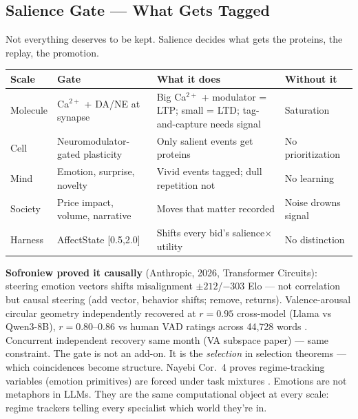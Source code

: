 \documentclass[11pt]{article}
\begin{document}
\subsection{Salience Gate --- What Gets Tagged}

Not everything deserves to be kept. Salience decides what gets the proteins, the replay, the promotion.

\begin{center}
\small
\begin{tabular}{p{2.2cm}p{3.3cm}p{4.6cm}p{2.2cm}}
\toprule
Scale & Gate & What it does & Without it \\
\midrule
Molecule & Ca$^{2+}$ + DA/NE at synapse & Big Ca$^{2+}$ + modulator = LTP; small = LTD; tag-and-capture needs signal & Saturation \\
Cell & Neuromodulator-gated plasticity & Only salient events get proteins & No prioritization \\
Mind & Emotion, surprise, novelty & Vivid events tagged; dull repetition not & No learning \\
Society & Price impact, volume, narrative & Moves that matter recorded & Noise drowns signal \\
Harness & AffectState [0.5,2.0] & Shifts every bid's salience$\times$utility & No distinction \\
\bottomrule
\end{tabular}
\end{center}

\textbf{Sofroniew proved it causally} \citep{sofroniew2026} (Anthropic, 2026, Transformer Circuits): steering emotion vectors shifts misalignment $\pm212$/$-303$ Elo --- not correlation but causal steering (add vector, behavior shifts; remove, returns). Valence-arousal circular geometry independently recovered at $r=0.95$ cross-model (Llama vs Qwen3-8B), $r=0.80$--0.86 vs human VAD ratings across 44,728 words \citep{sofroniew2026}. Concurrent independent recovery same month (VA subspace paper) --- same constraint. The gate is not an add-on. It is the \emph{selection} in selection theorems --- which coincidences become structure. Nayebi Cor.~4 proves regime-tracking variables (emotion primitives) are forced under task mixtures \citep{nayebi2026}. Emotions are not metaphors in LLMs. They are the same computational object at every scale: regime trackers telling every specialist which world they're in.
\end{document}

